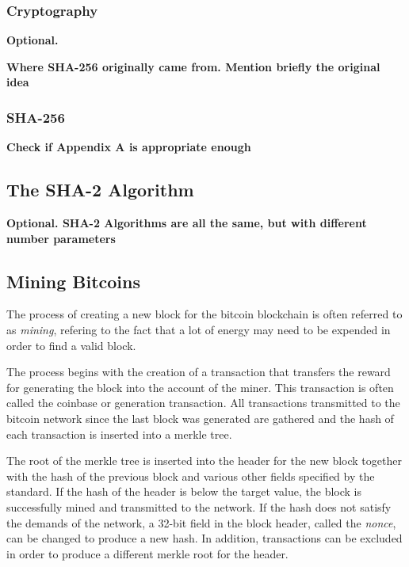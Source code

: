 \subsubsection{Cryptography}
\textbf{Optional.}

\textbf{Where SHA-256 originally came from. Mention briefly the original idea}

\subsubsection{SHA-256}
\textbf{Check if Appendix A is appropriate enough}



\subsection{The SHA-2 Algorithm}
\textbf{Optional. SHA-2 Algorithms are all the same, but with different number parameters}

\subsection{Mining Bitcoins}
\label{sec:bitcoin-mining}

The process of creating a new block for the bitcoin blockchain is often referred to as \textit{mining},
refering to the fact that a  lot of energy may need to be expended in order to find a valid block.

The process begins with the creation of a transaction that transfers the reward for generating the block
into the account of the miner. This transaction is often called the coinbase or generation transaction.
All transactions transmitted to the bitcoin network since the last block was generated are gathered and
the hash of each transaction is inserted into a merkle tree.

The root of the merkle tree is inserted into the header for the new block together with the hash of the
previous block and various other fields specified by the standard. If the hash of the header is below the
target value, the block is successfully mined and transmitted to the network. If the hash does not satisfy
the demands of the network, a 32-bit field in the block header, called the \textit{nonce}, can be changed
to produce a new hash. In addition, transactions can be excluded in order to produce a different merkle
root for the header.

